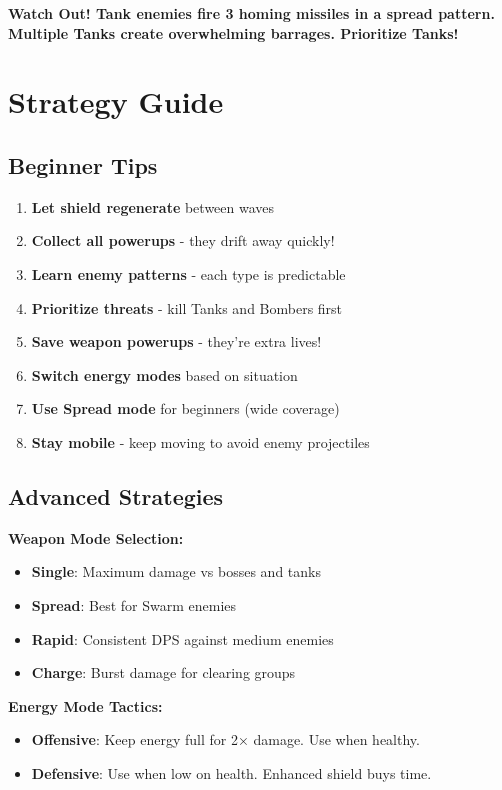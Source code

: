 \documentclass[11pt,a4paper]{article}
\newcommand{\infobox}[2]{%
    \vspace{0.3cm}
    \noindent\colorbox{#1!10}{%
        \parbox{\dimexpr\textwidth-2\fboxsep}{%
            \textcolor{#1}{\textbf{#2}}
        }
    }
    \vspace{0.3cm}
}
\begin{document}
\infobox{warningcolor}{\textbf{Watch Out!} Tank enemies fire 3 homing missiles in a spread pattern. Multiple Tanks create overwhelming barrages. Prioritize Tanks!}

\section{Strategy Guide}

\subsection{Beginner Tips}

\begin{enumerate}
    \item \textbf{Let shield regenerate} between waves
    \item \textbf{Collect all powerups} - they drift away quickly!
    \item \textbf{Learn enemy patterns} - each type is predictable
    \item \textbf{Prioritize threats} - kill Tanks and Bombers first
    \item \textbf{Save weapon powerups} - they're extra lives!
    \item \textbf{Switch energy modes} based on situation
    \item \textbf{Use Spread mode} for beginners (wide coverage)
    \item \textbf{Stay mobile} - keep moving to avoid enemy projectiles
\end{enumerate}

\subsection{Advanced Strategies}

\textbf{Weapon Mode Selection:}
\begin{itemize}
    \item \textbf{Single}: Maximum damage vs bosses and tanks
    \item \textbf{Spread}: Best for Swarm enemies
    \item \textbf{Rapid}: Consistent DPS against medium enemies
    \item \textbf{Charge}: Burst damage for clearing groups
\end{itemize}

\textbf{Energy Mode Tactics:}
\begin{itemize}
    \item \textbf{Offensive}: Keep energy full for 2× damage. Use when healthy.
    \item \textbf{Defensive}: Use when low on health. Enhanced shield buys time.
\end{itemize}
\end{document}
